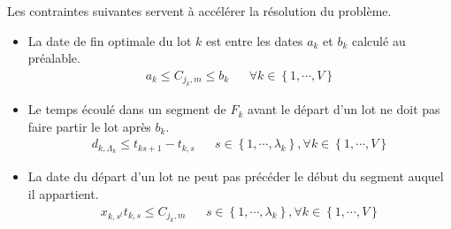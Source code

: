 Les contraintes suivantes servent à accélérer la résolution du problème.
\begin{itemize}
	\item
	      La date de fin optimale du lot $k$ est entre les dates $a_k$ et $b_k$ calculé au préalable.
	      \begin{align}
		      a_k \leq C_{j_k, m} \leq b_k &  & \forall k \in \left\{1,\cdots,V\right\}
	      \end{align}
	\item
	      Le temps écoulé dans un segment de $F_k$ avant le départ d'un lot ne doit pas faire partir le lot après $b_k$.
	      \begin{align}
		      d_{k, \Lambda_k} \leq t_{k s+1} - t_{k, s} &  & s \in \left\{1,\cdots,\lambda_k\right\}, \forall k \in \left\{1,\cdots,V\right\}
	      \end{align}
	\item
	      La date du départ d'un lot ne peut pas précéder le début du segment auquel il appartient.
	      \begin{align}
		      x_{k, s^t} t_{k, s} \leq C_{j_k, m} &  & s \in \left\{1,\cdots,\lambda_k\right\}, \forall k \in \left\{1,\cdots,V\right\}
	      \end{align}
\end{itemize}

